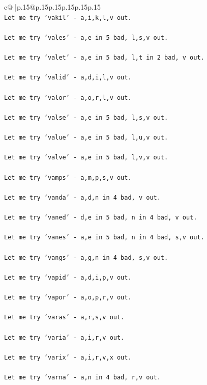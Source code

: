 \documentclass{article}
\begin{document}
{\begin{supertabular}{c@{$\;$}|p{.15\linewidth}@{}p{.15\linewidth}p{.15\linewidth}p{.15\linewidth}p{.15\linewidth}p{.15\linewidth}}
{{{\\ 
\texttt{Let me try 'vakil' {-} a,i,k,l,v out. } \\
\\ 
\texttt{Let me try 'vales' {-} a,e in 5 bad, l,s,v out. } \\
\\ 
\texttt{Let me try 'valet' {-} a,e in 5 bad, l,t in 2 bad, v out. } \\
\\ 
\texttt{Let me try 'valid' {-} a,d,i,l,v out. } \\
\\ 
\texttt{Let me try 'valor' {-} a,o,r,l,v out. } \\
\\ 
\texttt{Let me try 'valse' {-} a,e in 5 bad, l,s,v out. } \\
\\ 
\texttt{Let me try 'value' {-} a,e in 5 bad, l,u,v out. } \\
\\ 
\texttt{Let me try 'valve' {-} a,e in 5 bad, l,v,v out. } \\
\\ 
\texttt{Let me try 'vamps' {-} a,m,p,s,v out. } \\
\\ 
\texttt{Let me try 'vanda' {-} a,d,n in 4 bad, v out. } \\
\\ 
\texttt{Let me try 'vaned' {-} d,e in 5 bad, n in 4 bad, v out. } \\
\\ 
\texttt{Let me try 'vanes' {-} a,e in 5 bad, n in 4 bad, s,v out. } \\
\\ 
\texttt{Let me try 'vangs' {-} a,g,n in 4 bad, s,v out. } \\
\\ 
\texttt{Let me try 'vapid' {-} a,d,i,p,v out. } \\
\\ 
\texttt{Let me try 'vapor' {-} a,o,p,r,v out. } \\
\\ 
\texttt{Let me try 'varas' {-} a,r,s,v out. } \\
\\ 
\texttt{Let me try 'varia' {-} a,i,r,v out. } \\
\\ 
\texttt{Let me try 'varix' {-} a,i,r,v,x out. } \\
\\ 
\texttt{Let me try 'varna' {-} a,n in 4 bad, r,v out. } \\
}}}
\end{supertabular}}
\end{document}
